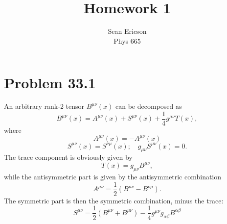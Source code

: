 \documentclass[12pt]{article}
\begin{document}
\title{Homework 1}
\author{Sean Ericson \\ Phys 665}
\maketitle

\section*{Problem 33.1}
An arbitrary rank-2 tensor $B^{\mu\nu}(x)$ can be decomposed as
\[ B^{\mu\nu}(x) = A^{\mu\nu}(x) + S^{\mu\nu}(x) + \frac{1}{4}g^{\mu\nu}T(x), \]
where
\[ A^{\mu\nu}(x) = -A^{\mu\nu}(x) \]
\[ S^{\mu\nu}(x) = S^{\nu\mu}(x); \quad g_{\mu\nu}S^{\mu\nu}(x) = 0. \]
The trace component is obviously given by
\[ T(x) = g_{\mu\nu}B^{\mu\nu}, \]
while the antisymmetric part is given by the antisymmetric combination
\[ A^{\mu\nu} = \frac{1}{2}\left(B^{\mu\nu} - B^{\nu\mu}\right). \]
The symmetric part is then the symmetric combination, minus the trace:
\[ S^{\mu\nu} = \frac{1}{2}\left(B^{\mu\nu} + B^{\mu\nu}\right) - \frac{1}{4}g^{\mu\nu}g_{\alpha\beta}B^{\alpha\beta}\]
\end{document}
